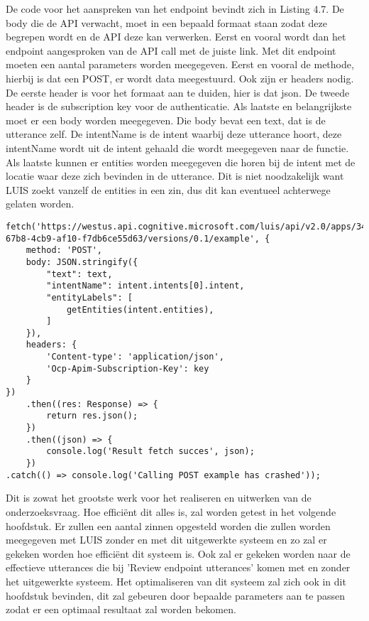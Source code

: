 De code voor het aanspreken van het endpoint bevindt zich in Listing 4.7. De body die de API verwacht, moet in een bepaald formaat staan zodat deze begrepen wordt en de API deze kan verwerken. Eerst en vooral wordt dan het endpoint aangesproken van de API call met de juiste link. Met dit endpoint moeten een aantal parameters worden meegegeven. Eerst en vooral de methode, hierbij is dat een POST, er wordt data meegestuurd. Ook zijn er headers nodig. De eerste header is voor het formaat aan te duiden, hier is dat json. De tweede header is de subscription key voor de authenticatie. Als laatste en belangrijkste moet er een body worden meegegeven. Die body bevat een text, dat is de utterance zelf. De intentName is de intent waarbij deze utterance hoort, deze intentName wordt uit de intent gehaald die wordt meegegeven naar de functie. Als laatste kunnen er entities worden meegegeven die horen bij de intent met de locatie waar deze zich bevinden in de utterance. Dit is niet noodzakelijk want LUIS zoekt vanzelf de entities in een zin, dus dit kan eventueel achterwege gelaten worden.

\medskip
\begin{lstlisting}[caption=Toevoegen van een input aan LUIS van een API call]
fetch('https://westus.api.cognitive.microsoft.com/luis/api/v2.0/apps/3480e277-67b8-4cb9-af10-f7db6ce55d63/versions/0.1/example', {
	method: 'POST',
	body: JSON.stringify({
		"text": text,
		"intentName": intent.intents[0].intent,
		"entityLabels": [
			getEntities(intent.entities),
		]
	}),
	headers: {
		'Content-type': 'application/json',
		'Ocp-Apim-Subscription-Key': key
	}
})
	.then((res: Response) => {
		return res.json();
	})
	.then((json) => {
		console.log('Result fetch succes', json);
	})
.catch(() => console.log('Calling POST example has crashed'));
\end{lstlisting}

Dit is zowat het grootste werk voor het realiseren en uitwerken van de onderzoeksvraag. Hoe efficiënt dit alles is, zal worden getest in het volgende hoofdstuk. Er zullen een aantal zinnen opgesteld worden die zullen worden meegegeven met LUIS zonder en met dit uitgewerkte systeem en zo zal er gekeken worden hoe efficiënt dit systeem is. Ook zal er gekeken worden naar de effectieve utterances die bij 'Review endpoint utterances' komen met en zonder het uitgewerkte systeem. Het optimaliseren van dit systeem zal zich ook in dit hoofdstuk bevinden, dit zal gebeuren door bepaalde parameters aan te passen zodat er een optimaal resultaat zal worden bekomen.

